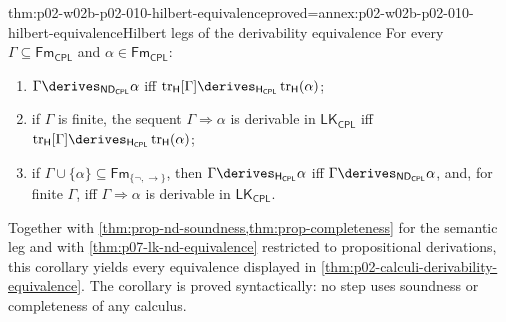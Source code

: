 \begin{hbcorollary}{thm:p02-w02b-p02-010-hilbert-equivalence}{proved=annex:p02-w02b-p02-010-hilbert-equivalence}{Hilbert legs of the derivability equivalence}
For every \(\Gamma\subseteq\mathsf{Fm}_{\mathsf{CPL}}\) and
\(\alpha\in\mathsf{Fm}_{\mathsf{CPL}}\):
\begin{enumerate}
  \item \(\Gamma\derives_{\mathsf{ND}_{\mathsf{CPL}}}\alpha\) iff
    \(\operatorname{tr}_{\mathsf H}[\Gamma]\derives_{\mathsf H_{\mathsf{CPL}}}
    \operatorname{tr}_{\mathsf H}(\alpha)\);
  \item if \(\Gamma\) is finite, the sequent \(\Gamma\Rightarrow\alpha\) is
    derivable in \(\mathsf{LK}_{\mathsf{CPL}}\) iff
    \(\operatorname{tr}_{\mathsf H}[\Gamma]\derives_{\mathsf H_{\mathsf{CPL}}}
    \operatorname{tr}_{\mathsf H}(\alpha)\);
  \item if \(\Gamma\cup\{\alpha\}\subseteq\mathsf{Fm}_{\{\neg,\to\}}\), then
    \(\Gamma\derives_{\mathsf H_{\mathsf{CPL}}}\alpha\) iff
    \(\Gamma\derives_{\mathsf{ND}_{\mathsf{CPL}}}\alpha\), and, for finite
    \(\Gamma\), iff \(\Gamma\Rightarrow\alpha\) is derivable in
    \(\mathsf{LK}_{\mathsf{CPL}}\).
\end{enumerate}
\end{hbcorollary}

Together with \cref{thm:prop-nd-soundness,thm:prop-completeness} for the
semantic leg and with \cref{thm:p07-lk-nd-equivalence} restricted to
propositional derivations, this corollary yields every equivalence displayed
in \cref{thm:p02-calculi-derivability-equivalence}.  The corollary is proved
syntactically: no step uses soundness or completeness of any calculus.

